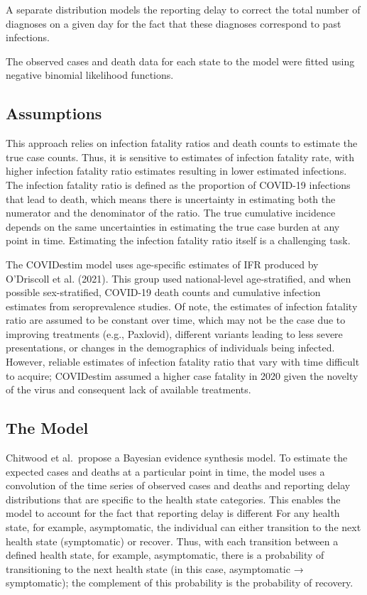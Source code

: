 \documentclass[12pt,twoside]{smiththesis}
\begin{document}
A separate distribution models the reporting delay to correct the total number of diagnoses on a given day for the fact that these diagnoses correspond to past infections.

The observed cases and death data for each state to the model were fitted using negative binomial likelihood functions.

\hypertarget{assumptions}{%
\subsection{Assumptions}\label{assumptions}}

This approach relies on infection fatality ratios and death counts to estimate the true case counts. Thus, it is sensitive to estimates of infection fatality rate, with higher infection fatality ratio estimates resulting in lower estimated infections. The infection fatality ratio is defined as the proportion of COVID-19 infections that lead to death, which means there is uncertainty in estimating both the numerator and the denominator of the ratio. The true cumulative incidence depends on the same uncertainties in estimating the true case burden at any point in time. Estimating the infection fatality ratio itself is a challenging task.

The COVIDestim model uses age-specific estimates of IFR produced by O'Driscoll et al. (2021). This group used national-level age-stratified, and when possible sex-stratified, COVID-19 death counts and cumulative infection estimates from seroprevalence studies. Of note, the estimates of infection fatality ratio are assumed to be constant over time, which may not be the case due to improving treatments (e.g., Paxlovid), different variants leading to less severe presentations, or changes in the demographics of individuals being infected. However, reliable estimates of infection fatality ratio that vary with time difficult to acquire; COVIDestim assumed a higher case fatality in 2020 given the novelty of the virus and consequent lack of available treatments.

\hypertarget{the-model}{%
\subsection{The Model}\label{the-model}}

Chitwood et al.~propose a Bayesian evidence synthesis model. To estimate the expected cases and deaths at a particular point in time, the model uses a convolution of the time series of observed cases and deaths and reporting delay distributions that are specific to the health state categories. This enables the model to account for the fact that reporting delay is different For any health state, for example, asymptomatic, the individual can either transition to the next health state (symptomatic) or recover. Thus, with each transition between a defined health state, for example, asymptomatic, there is a probability of transitioning to the next health state (in this case, asymptomatic → symptomatic); the complement of this probability is the probability of recovery.
\end{document}
